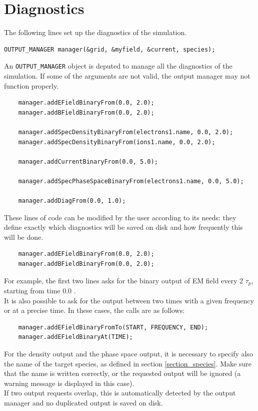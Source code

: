 \documentclass[11pt,a4paper]{report}
\begin{document}
\section{Diagnostics}
The following lines set up the diagnostics of the simulation.
\begin{lstlisting}[backgroundcolor=\color{no_modify}]
	OUTPUT_MANAGER manager(&grid, &myfield, &current, species);
\end{lstlisting}
An \verb+OUTPUT_MANAGER+ object is deputed to manage all the diagnostics of the simulation. If some of the arguments are not valid, the output manager may not function properly.
\begin{lstlisting}
	manager.addEFieldBinaryFrom(0.0, 2.0);
	manager.addBFieldBinaryFrom(0.0, 2.0);

	manager.addSpecDensityBinaryFrom(electrons1.name, 0.0, 2.0);
	manager.addSpecDensityBinaryFrom(ions1.name, 0.0, 2.0);

	manager.addCurrentBinaryFrom(0.0, 5.0);

	manager.addSpecPhaseSpaceBinaryFrom(electrons1.name, 0.0, 5.0);

	manager.addDiagFrom(0.0, 1.0);
\end{lstlisting}
These lines of code can be modified by the user according to its needs: they define exactly which diagnostics will be saved on disk and how frequently this will be done.
\begin{lstlisting}
	manager.addEFieldBinaryFrom(0.0, 2.0);
	manager.addBFieldBinaryFrom(0.0, 2.0);
\end{lstlisting}
For example, the first two lines asks for the binary output of EM field every 2 $\tau_p$, starting from time 0.0 . \\
It is also possible to ask for the output between two times with a given frequency or at a precise time. In these cases, the calls are as follows:
\begin{lstlisting}
	manager.addEFieldBinaryFromTo(START, FREQUENCY, END);
	manager.addEFieldBinaryAt(TIME);
\end{lstlisting}
For the density output and the phase space output, it is necessary to specify also the name of the target species, as defined in section \ref{section_species}. Make sure that the name is written correctly, or the requested output will be ignored (a warning message is displayed in this case).\\
If two output requests overlap, this is automatically detected by the output manager and no duplicated output is saved on disk. \\
\end{document}
